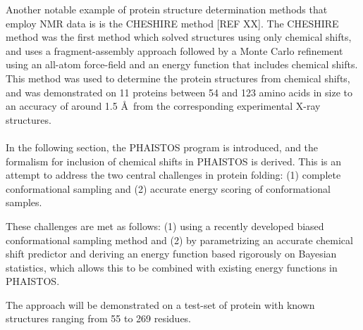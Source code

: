 Another notable example of protein structure determination methods that employ NMR data is is the CHESHIRE method [REF XX].
The CHESHIRE method was the first method which solved structures using only chemical shifts, and uses a fragment-assembly approach followed by a Monte Carlo refinement using an all-atom force-field and an energy function that includes chemical shifts.
This method was used to determine the protein structures from chemical shifts, and was demonstrated on 11 proteins between 54 and 123 amino acids in size to an accuracy of around 1.5 \AA~from the corresponding experimental X-ray structures.
\\\\
In the following section, the PHAISTOS program is introduced, and the formalism for inclusion of chemical shifts in PHAISTOS is derived.
This is an attempt to address the two central challenges in protein folding: (1) complete conformational sampling and (2) accurate energy scoring of conformational samples.

These challenges are met as follows: (1) using a recently developed biased conformational sampling method and (2) by parametrizing an accurate chemical shift predictor and deriving an energy function based rigorously on Bayesian statistics, which allows this to be combined with existing energy functions in PHAISTOS.

The approach will be demonstrated on a test-set of protein with known structures ranging from 55 to 269 residues.


